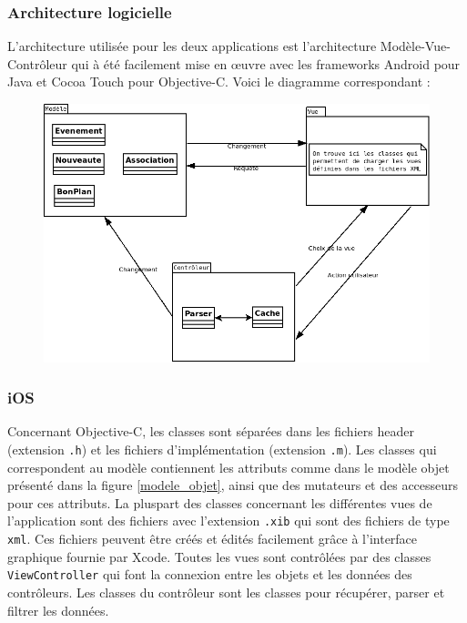 \documentclass[a4paper, 11px]{article}
\begin{document}
\subsubsection{Architecture logicielle}
L'architecture utilisée pour les deux applications est l'architecture Modèle-Vue-Contrôleur qui à été facilement mise en œuvre avec les frameworks Android pour Java et Cocoa Touch pour Objective-C. Voici le diagramme correspondant :
\begin{figure}[h!]
\begin{center}
\includegraphics[scale=0.3]{MVC.png}
\end{center}
\end{figure}

\subsubsection{iOS}
Concernant Objective-C, les classes sont séparées dans les fichiers header (extension \texttt{.h}) et les fichiers d'implémentation (extension \texttt{.m}).
Les classes qui correspondent au modèle contiennent les attributs comme dans le modèle objet présenté dans la figure \ref{modele_objet}, ainsi que des mutateurs et des accesseurs pour ces attributs. La pluspart des classes concernant les différentes vues de l'application sont des fichiers avec l'extension \texttt{.xib} qui sont des fichiers de type \texttt{xml}. Ces fichiers peuvent être créés et édités facilement grâce à l'interface graphique fournie par Xcode. Toutes les vues sont contrôlées par des classes \texttt{ViewController} qui font la connexion entre les objets et les données des contrôleurs.
Les classes du contrôleur sont les classes pour récupérer, parser et filtrer les données.\\
\end{document}
